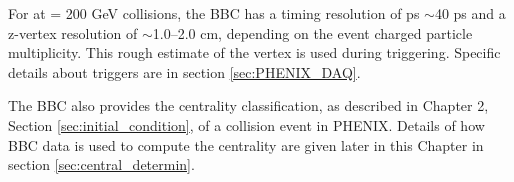 For \pau at \sqsn = 200 GeV collisions, the BBC has a timing resolution of ps $\sim$40 ps and a z-vertex resolution of $\sim$1.0--2.0 cm, depending on the event charged particle multiplicity. This rough estimate of the vertex is used during triggering. Specific details about triggers are in section \ref{sec:PHENIX_DAQ}.

The BBC also provides the centrality classification, as described in Chapter 2, Section \ref{sec:initial_condition}, of a collision event in PHENIX. Details of how BBC data is used to compute the centrality are given later in this Chapter in section \ref{sec:central_determin}.


